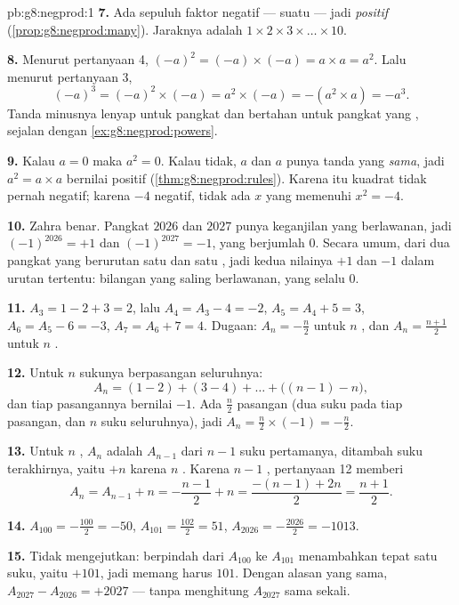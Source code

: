 \begin{solution}{pb:g8:negprod:1}
\textbf{7.} Ada sepuluh faktor negatif --- suatu  ---
jadi  \emph{positif} (\cref{prop:g8:negprod:many}).
Jaraknya adalah $1 \times 2 \times 3 \times \dots \times 10$.

\textbf{8.} Menurut pertanyaan 4, $(-a)^2 = (-a) \times (-a) = a \times a =
a^2$. Lalu menurut pertanyaan 3,
\[
(-a)^3 = (-a)^2 \times (-a) = a^2 \times (-a) = -(a^2 \times a)
= -a^3 .
\]
Tanda minusnya lenyap untuk pangkat  dan bertahan untuk pangkat
yang , sejalan dengan \cref{ex:g8:negprod:powers}.

\textbf{9.} Kalau $a = 0$ maka $a^2 = 0$. Kalau tidak, $a$ dan $a$
punya tanda yang \emph{sama}, jadi $a^2 = a \times a$ bernilai positif
(\cref{thm:g8:negprod:rules}). Karena itu kuadrat tidak pernah
negatif; karena $-4$ negatif, tidak ada  $x$ yang
memenuhi $x^2 = -4$.

\textbf{10.} Zahra benar. Pangkat $2026$ dan $2027$ punya
keganjilan yang berlawanan, jadi $(-1)^{2026} = +1$ dan
$(-1)^{2027} = -1$, yang berjumlah $0$. Secara umum, dari dua pangkat
yang berurutan satu  dan satu , jadi kedua nilainya $+1$
dan $-1$ dalam urutan tertentu: bilangan yang saling berlawanan, yang
 selalu $0$.

\textbf{11.} $A_3 = 1 - 2 + 3 = 2$, lalu
$A_4 = A_3 - 4 = -2$, $A_5 = A_4 + 5 = 3$, $A_6 = A_5 - 6 = -3$,
$A_7 = A_6 + 7 = 4$. Dugaan: $A_n = -\frac{n}{2}$ untuk $n$ ,
dan $A_n = \frac{n+1}{2}$ untuk $n$ .

\textbf{12.} Untuk $n$  sukunya berpasangan seluruhnya:
\[
A_n = (1 - 2) + (3 - 4) + \dots + \bigl((n-1) - n\bigr),
\]
dan tiap pasangannya bernilai $-1$. Ada $\frac{n}{2}$ pasangan (dua
suku pada tiap pasangan, dan $n$ suku seluruhnya), jadi
$A_n = \frac{n}{2} \times (-1) = -\frac{n}{2}$.

\textbf{13.} Untuk $n$ ,  $A_n$ adalah  $A_{n-1}$
dari $n - 1$ suku pertamanya, ditambah suku terakhirnya, yaitu $+n$
karena $n$ . Karena $n - 1$ , pertanyaan 12 memberi
\[
A_n = A_{n-1} + n = -\frac{n-1}{2} + n
= \frac{-(n-1) + 2n}{2} = \frac{n+1}{2} .
\]

\textbf{14.} $A_{100} = -\frac{100}{2} = -50$, \quad
$A_{101} = \frac{102}{2} = 51$, \quad
$A_{2026} = -\frac{2026}{2} = -1013$.

\textbf{15.} Tidak mengejutkan: berpindah dari $A_{100}$ ke
$A_{101}$ menambahkan tepat satu suku, yaitu $+101$, jadi 
memang harus $101$. Dengan alasan yang sama,
$A_{2027} - A_{2026} = +2027$ --- tanpa menghitung $A_{2027}$ sama sekali.

\end{solution}
